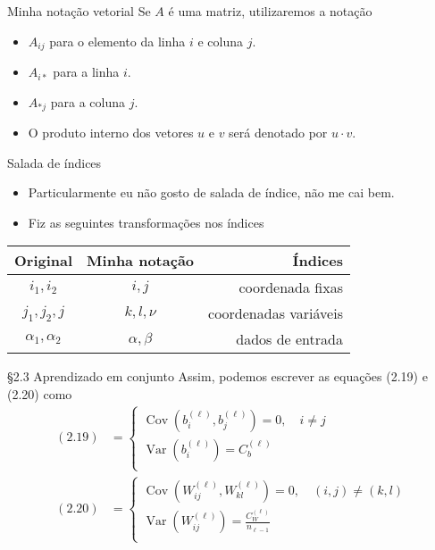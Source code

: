 \documentclass{beamer}
\DeclareMathOperator{\Cov}{Cov}
\DeclareMathOperator{\Var}{Var}
\newcommand{\aaA}{\alpha}
\newcommand{\aaB}{\beta}
\def\eell{{(\ell)}}
\begin{document}
\begin{frame}{Minha notação vetorial}
	Se $A$ é uma matriz, utilizaremos a notação 
	\begin{itemize}
		\item $A_{ij}$ para o elemento da linha $i$ e coluna $j$.
		\item $A_{i*}$ para a linha $i$.	
		\item $A_{*j}$ para a coluna $j$.
		\item O produto interno dos vetores $u$ e $v$ será denotado por $u\cdot v$.
	\end{itemize}
\end{frame}

\begin{frame}{Salada de índices}
	\begin{itemize}
		\item Particularmente eu não gosto de salada de índice, não me cai bem. 
		\item Fiz as seguintes transformações nos índices
		
	\end{itemize}
	\begin{center}
		\begin{tabular}{c c r}
			\hline
			\textbf{Original}  &\textbf{Minha notação} & \textbf{Índices}\\
			\hline
			 $i_1, i_2$ & $i, j$ &  coordenada fixas \\ 
			 $j_1, j_2, j$ & $k, l, \nu$ &  coordenadas variáveis \\		
			 $\alpha_1, \alpha_2$  & $\aaA, \aaB$ & dados de entrada \\
		\end{tabular}		
	\end{center}
	
\end{frame}

\begin{frame}{\S 2.3 Aprendizado em conjunto}	
	Assim, podemos escrever as equações (2.19) e (2.20) como
	\begin{align*}
		(2.19) &= \begin{cases}
		\Cov\left(b^\eell_{i},b^\eell_j\right) = 0, \quad i\neq j\\[1ex]
		\Var\left(b^\eell_{i}\right) = C_b^\eell \\
		\end{cases}  \tag{2.19'}\\[2ex] 
		(2.20) &= \begin{cases}
		\Cov\left(W^\eell_{ij},W^\eell_{kl}\right) = 0, \quad (i,j)\neq (k,l)\\[1ex]
		\Var\left(W^\eell_{ij}\right) = \frac{C_W^\eell}{n_{\ell-1}} \\
		\end{cases} \tag{2.20'}
	\end{align*}
\end{frame}
\end{document}

